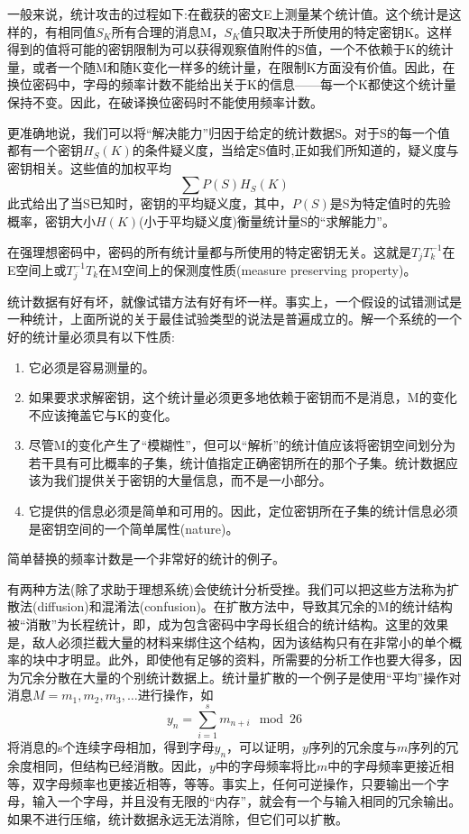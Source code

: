 \documentclass[]{article}
\begin{document}
一般来说，统计攻击的过程如下:在截获的密文E上测量某个统计值。这个统计是这样的，有相同值$S_K$所有合理的消息M，$S_K$值只取决于所使用的特定密钥K。这样得到的值将可能的密钥限制为可以获得观察值附件的S值，一个不依赖于K的统计量，或者一个随M和随K变化一样多的统计量，在限制K方面没有价值。因此，在换位密码中，字母的频率计数不能给出关于K的信息——每一个K都使这个统计量保持不变。因此，在破译换位密码时不能使用频率计数。

更准确地说，我们可以将“解决能力”归因于给定的统计数据S。对于S的每一个值都有一个密钥$H_S(K)$的条件疑义度，当给定S值时,正如我们所知道的，疑义度与密钥相关。这些值的加权平均\[\sum{P(S)H_S(K)}\]此式给出了当S已知时，密钥的平均疑义度，其中，$P(S)$是S为特定值时的先验概率，密钥大小$H(K)$(小于平均疑义度)衡量统计量S的“求解能力”。

在强理想密码中，密码的所有统计量都与所使用的特定密钥无关。这就是$T_jT_k^{-1}$在E空间上或$T_j^{-1}T_k$在M空间上的保测度性质(measure preserving property)。

统计数据有好有坏，就像试错方法有好有坏一样。事实上，一个假设的试错测试是一种统计，上面所说的关于最佳试验类型的说法是普遍成立的。解一个系统的一个好的统计量必须具有以下性质:
\begin{enumerate}
	\item 它必须是容易测量的。
	\item 如果要求求解密钥，这个统计量必须更多地依赖于密钥而不是消息，M的变化不应该掩盖它与K的变化。 
	\item 尽管M的变化产生了“模糊性”，但可以“解析”的统计值应该将密钥空间划分为若干具有可比概率的子集，统计值指定正确密钥所在的那个子集。统计数据应该为我们提供关于密钥的大量信息，而不是一小部分。
	\item 它提供的信息必须是简单和可用的。因此，定位密钥所在子集的统计信息必须是密钥空间的一个简单属性(nature)。
\end{enumerate}

简单替换的频率计数是一个非常好的统计的例子。

有两种方法(除了求助于理想系统)会使统计分析受挫。我们可以把这些方法称为扩散法(diffusion)和混淆法(confusion)。在扩散方法中，导致其冗余的M的统计结构被“消散”为长程统计，即，成为包含密码中字母长组合的统计结构。这里的效果是，敌人必须拦截大量的材料来绑住这个结构，因为该结构只有在非常小的单个概率的块中才明显。此外，即使他有足够的资料，所需要的分析工作也要大得多，因为冗余分散在大量的个别统计数据上。统计量扩散的一个例子是使用“平均”操作对消息$M=m_1,m_2,m_3,\dots$进行操作，如
\[y_n=\sum_{i=1}^{s} m_{n+i}\mod{26}\]
将消息的s个连续字母相加，得到字母$y_n$，可以证明，$y$序列的冗余度与$m$序列的冗余度相同，但结构已经消散。因此，$y$中的字母频率将比$m$中的字母频率更接近相等，双字母频率也更接近相等，等等。事实上，任何可逆操作，只要输出一个字母，输入一个字母，并且没有无限的“内存”，就会有一个与输入相同的冗余输出。如果不进行压缩，统计数据永远无法消除，但它们可以扩散。
\end{document}
